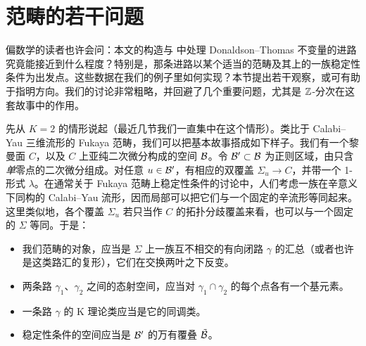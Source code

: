 
\providecommand{\nsing}{l}

\section{范畴的若干问题} \label{sec:category}

偏数学的读者也许会问：本文的构造与 \cite{ks1} 中处理 Donaldson–Thomas 不变量的进路究竟能接近到什么程度？特别是，那条进路以某个适当的范畴及其上的一族稳定性条件为出发点。这些数据在我们的例子里如何实现？本节提出若干观察，或可有助于指明方向。我们的讨论非常粗略，并回避了几个重要问题，尤其是 $\mathbb{Z}$-分次在这套故事中的作用。

先从 $K=2$ 的情形说起（最近几节我们一直集中在这个情形）。类比于 Calabi–Yau 三维流形的 Fukaya 范畴，我们可以把基本故事搭成如下样子。我们有一个黎曼面 $C$，以及 $C$ 上亚纯二次微分构成的空间 $\mathcal{B}$。令 $\mathcal{B}'\subset\mathcal{B}$ 为正则区域，由只含\emph{单}零点的二次微分组成。对任意 $u\in\mathcal{B}'$，有相应的双覆盖 $\Sigma_u\to C$，并带一个 1-形式 $\lambda$。在通常关于 Fukaya 范畴上稳定性条件的讨论中，人们考虑一族在辛意义下同构的 Calabi–Yau 流形，因而局部可以把它们与一个固定的辛流形等同起来。这里类似地，各个覆盖 $\Sigma_u$ 若只当作 $C$ 的拓扑分歧覆盖来看，也可以与一个固定的 $\Sigma$ 等同。于是：

\begin{itemize}

\item 我们范畴的对象，应当是 $\Sigma$ 上一族互不相交的有向闭路 $\gamma$ 的汇总（或者也许是这类路汇的复形），它们在交换两叶之下反变。

\item 两条路 $\gamma_1$、$\gamma_2$ 之间的态射空间，应当对 $\gamma_1\cap\gamma_2$ 的每个点各有一个基元素。

\item 一条路 $\gamma$ 的 K 理论类应当是它的同调类。

\item 稳定性条件的空间应当是 $\mathcal{B}'$ 的万有覆叠 $\tilde{\mathcal{B}}$。

\end{itemize}


